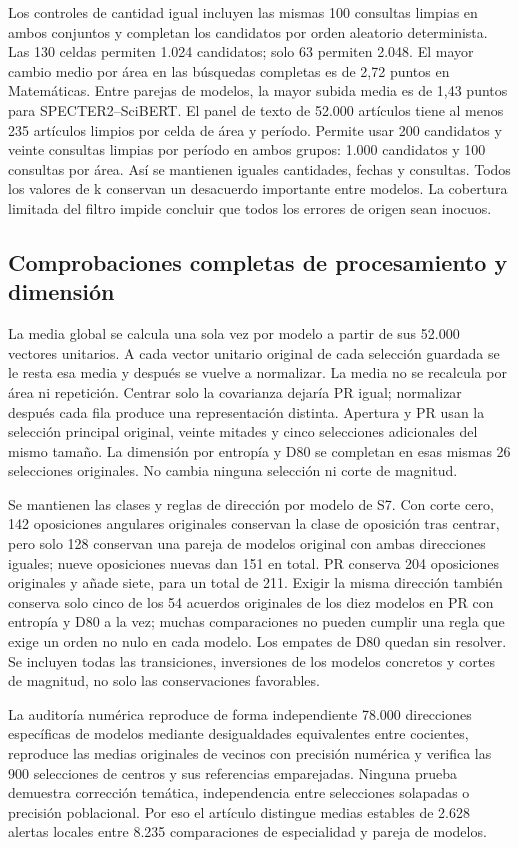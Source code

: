 \documentclass[12pt]{article}
\begin{document}
Los controles de cantidad igual incluyen las mismas 100 consultas limpias en ambos conjuntos y completan los candidatos por orden aleatorio determinista. Las 130 celdas permiten 1.024 candidatos; solo 63 permiten 2.048. El mayor cambio medio por área en las búsquedas completas es de 2,72 puntos en Matemáticas. Entre parejas de modelos, la mayor subida media es de 1,43 puntos para SPECTER2--SciBERT. El panel de texto de 52.000 artículos tiene al menos 235 artículos limpios por celda de área y período. Permite usar 200 candidatos y veinte consultas limpias por período en ambos grupos: 1.000 candidatos y 100 consultas por área. Así se mantienen iguales cantidades, fechas y consultas. Todos los valores de k conservan un desacuerdo importante entre modelos. La cobertura limitada del filtro impide concluir que todos los errores de origen sean inocuos.

\FloatBarrier

\subsection{Comprobaciones completas de procesamiento y dimensión}
La media global se calcula una sola vez por modelo a partir de sus 52.000 vectores unitarios. A cada vector unitario original de cada selección guardada se le resta esa media y después se vuelve a normalizar. La media no se recalcula por área ni repetición. Centrar solo la covarianza dejaría PR igual; normalizar después cada fila produce una representación distinta. Apertura y PR usan la selección principal original, veinte mitades y cinco selecciones adicionales del mismo tamaño. La dimensión por entropía y D80 se completan en esas mismas 26 selecciones originales. No cambia ninguna selección ni corte de magnitud.

Se mantienen las clases y reglas de dirección por modelo de S7. Con corte cero, 142 oposiciones angulares originales conservan la clase de oposición tras centrar, pero solo 128 conservan una pareja de modelos original con ambas direcciones iguales; nueve oposiciones nuevas dan 151 en total. PR conserva 204 oposiciones originales y añade siete, para un total de 211. Exigir la misma dirección también conserva solo cinco de los 54 acuerdos originales de los diez modelos en PR con entropía y D80 a la vez; muchas comparaciones no pueden cumplir una regla que exige un orden no nulo en cada modelo. Los empates de D80 quedan sin resolver. Se incluyen todas las transiciones, inversiones de los modelos concretos y cortes de magnitud, no solo las conservaciones favorables.

\FloatBarrier

La auditoría numérica reproduce de forma independiente 78.000 direcciones específicas de modelos mediante desigualdades equivalentes entre cocientes, reproduce las medias originales de vecinos con precisión numérica y verifica las 900 selecciones de centros y sus referencias emparejadas. Ninguna prueba demuestra corrección temática, independencia entre selecciones solapadas o precisión poblacional. Por eso el artículo distingue medias estables de 2.628 alertas locales entre 8.235 comparaciones de especialidad y pareja de modelos.

\FloatBarrier


\end{document}

